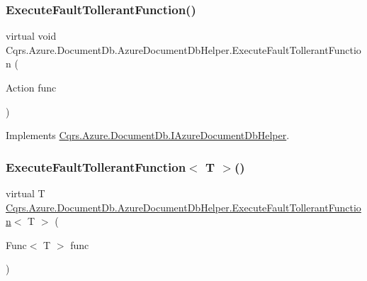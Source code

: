 \subsubsection{\texorpdfstring{Execute\+Fault\+Tollerant\+Function()}{ExecuteFaultTollerantFunction()}}
{\footnotesize\ttfamily virtual void Cqrs.\+Azure.\+Document\+Db.\+Azure\+Document\+Db\+Helper.\+Execute\+Fault\+Tollerant\+Function (\begin{DoxyParamCaption}\item[{Action}]{func }\end{DoxyParamCaption})\hspace{0.3cm}{\ttfamily [virtual]}}



Implements \hyperlink{interfaceCqrs_1_1Azure_1_1DocumentDb_1_1IAzureDocumentDbHelper_af0a2c96f00154420faa7c528d5bf55bb_af0a2c96f00154420faa7c528d5bf55bb}{Cqrs.\+Azure.\+Document\+Db.\+I\+Azure\+Document\+Db\+Helper}.

\mbox{\label{classCqrs_1_1Azure_1_1DocumentDb_1_1AzureDocumentDbHelper_a470fcc86befa4a28725ad53e715a223c_a470fcc86befa4a28725ad53e715a223c}} 
\subsubsection{\texorpdfstring{Execute\+Fault\+Tollerant\+Function$<$ T $>$()}{ExecuteFaultTollerantFunction< T >()}}
{\footnotesize\ttfamily virtual T \hyperlink{classCqrs_1_1Azure_1_1DocumentDb_1_1AzureDocumentDbHelper_a334337444ff416c9f4ce48ec61e60a83_a334337444ff416c9f4ce48ec61e60a83}{Cqrs.\+Azure.\+Document\+Db.\+Azure\+Document\+Db\+Helper.\+Execute\+Fault\+Tollerant\+Function}$<$ T $>$ (\begin{DoxyParamCaption}\item[{Func$<$ T $>$}]{func }\end{DoxyParamCaption})\hspace{0.3cm}{\ttfamily [virtual]}}



